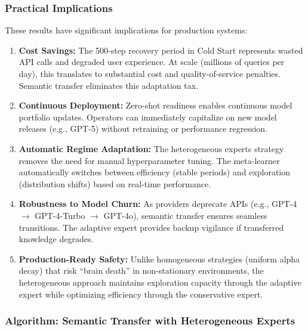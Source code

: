 \subsubsection{Practical Implications}

These results have significant implications for production systems:

\begin{enumerate}
    \item \textbf{Cost Savings:} The 500-step recovery period in Cold Start represents wasted API calls and degraded user experience. At scale (millions of queries per day), this translates to substantial cost and quality-of-service penalties. Semantic transfer eliminates this adaptation tax.
    
    \item \textbf{Continuous Deployment:} Zero-shot readiness enables continuous model portfolio updates. Operators can immediately capitalize on new model releases (e.g., GPT-5) without retraining or performance regression.
    
    \item \textbf{Automatic Regime Adaptation:} The heterogeneous experts strategy removes the need for manual hyperparameter tuning. The meta-learner automatically switches between efficiency (stable periods) and exploration (distribution shifts) based on real-time performance.
    
    \item \textbf{Robustness to Model Churn:} As providers deprecate APIs (e.g., GPT-4 $\to$ GPT-4-Turbo $\to$ GPT-4o), semantic transfer ensures seamless transitions. The adaptive expert provides backup vigilance if transferred knowledge degrades.
    
    \item \textbf{Production-Ready Safety:} Unlike homogeneous strategies (uniform alpha decay) that risk ``brain death'' in non-stationary environments, the heterogeneous approach maintains exploration capacity through the adaptive expert while optimizing efficiency through the conservative expert.
\end{enumerate}


\subsubsection{Algorithm: Semantic Transfer with Heterogeneous Experts}

